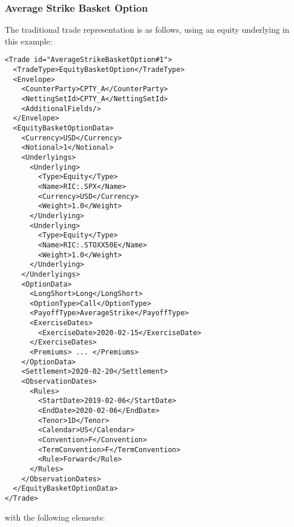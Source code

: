 \subsubsection*{Average Strike Basket Option}

The traditional trade representation is as follows, using an equity underlying in this example:

\begin{verbatim}
<Trade id="AverageStrikeBasketOption#1">
  <TradeType>EquityBasketOption</TradeType>
  <Envelope>
    <CounterParty>CPTY_A</CounterParty>
    <NettingSetId>CPTY_A</NettingSetId>
    <AdditionalFields/>
  </Envelope>
  <EquityBasketOptionData>
    <Currency>USD</Currency>
    <Notional>1</Notional>
    <Underlyings>
      <Underlying>
        <Type>Equity</Type>
        <Name>RIC:.SPX</Name>
        <Currency>USD</Currency>
        <Weight>1.0</Weight>
      </Underlying>
      <Underlying>
        <Type>Equity</Type>
        <Name>RIC:.STOXX50E</Name>
        <Weight>1.0</Weight>
      </Underlying>
    </Underlyings>
    <OptionData>
      <LongShort>Long</LongShort>
      <OptionType>Call</OptionType>
      <PayoffType>AverageStrike</PayoffType>
      <ExerciseDates>
        <ExerciseDate>2020-02-15</ExerciseDate>
      </ExerciseDates>
      <Premiums> ... </Premiums>  
    </OptionData>
    <Settlement>2020-02-20</Settlement>
    <ObservationDates>
      <Rules>
        <StartDate>2019-02-06</StartDate>
        <EndDate>2020-02-06</EndDate>
        <Tenor>1D</Tenor>
        <Calendar>US</Calendar>
        <Convention>F</Convention>
        <TermConvention>F</TermConvention>
        <Rule>Forward</Rule>
      </Rules>
    </ObservationDates>
  </EquityBasketOptionData>
</Trade>
\end{verbatim}

with the following elements:

